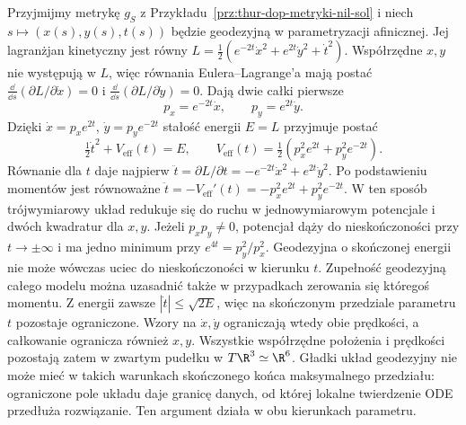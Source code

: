 \begin{przyklad}
\label{prz:thur-dop-geodezyjne-sol}
Przyjmijmy metrykę $g_S$ z Przykładu~\ref{prz:thur-dop-metryki-nil-sol}
i niech $s\mapsto (x(s),y(s),t(s))$ będzie geodezyjną
w parametryzacji afinicznej. Jej lagranżjan kinetyczny jest równy
$L=\tfrac12(e^{-2t}\dot x^2+e^{2t}\dot y^2+\dot t^2)$.
Współrzędne $x,y$ nie występują w $L$, więc równania
Eulera--Lagrange'a mają postać
$\frac{\dd}{\dd s}(\partial L/\partial\dot x)=0$
i $\frac{\dd}{\dd s}(\partial L/\partial\dot y)=0$.
Dają dwie całki pierwsze
\begin{equation}\label{eq:thur-dop-sol-momenty}
 p_x=e^{-2t}\dot x,\qquad p_y=e^{2t}\dot y.
\end{equation}
Dzięki $\dot x=p_xe^{2t}$, $\dot y=p_ye^{-2t}$
stałość energii $E=L$ przyjmuje postać
\begin{equation}\label{eq:thur-dop-sol-energia}
 \tfrac12\dot t^2+V_{\mathrm{eff}}(t)=E,\qquad
 V_{\mathrm{eff}}(t)=\tfrac12(p_x^2e^{2t}+p_y^2e^{-2t}).
\end{equation}
Równanie dla $t$ daje najpierw
$\ddot t=\partial L/\partial t=-e^{-2t}\dot x^2+e^{2t}\dot y^2$.
Po podstawieniu momentów jest równoważne
$\ddot t=-V_{\mathrm{eff}}'(t)
=-p_x^2e^{2t}+p_y^2e^{-2t}$.
W ten sposób trójwymiarowy układ redukuje się do ruchu
w jednowymiarowym potencjale i dwóch kwadratur dla $x,y$.
Jeżeli $p_xp_y\ne0$, potencjał dąży do nieskończoności
przy $t\to\pm\infty$ i ma jedno minimum przy
$e^{4t}=p_y^2/p_x^2$. Geodezyjna o skończonej energii
nie może wówczas uciec do nieskończoności w kierunku $t$.
Zupełność geodezyjną całego modelu można uzasadnić także
w przypadkach zerowania się któregoś momentu.
Z energii zawsze $|\dot t|\leq\sqrt{2E}$,
więc na skończonym przedziale parametru $t$ pozostaje ograniczone.
Wzory na $\dot x,\dot y$ ograniczają wtedy obie prędkości,
a całkowanie ogranicza również $x,y$.
Wszystkie współrzędne położenia i prędkości pozostają
zatem w zwartym pudełku w $T\R^3\simeq\R^6$.
Gładki układ geodezyjny nie może mieć w takich warunkach
skończonego końca maksymalnego przedziału: ograniczone
pole układu daje granicę danych, od której lokalne
twierdzenie ODE przedłuża rozwiązanie.
Ten argument działa w obu kierunkach parametru.
\end{przyklad}


